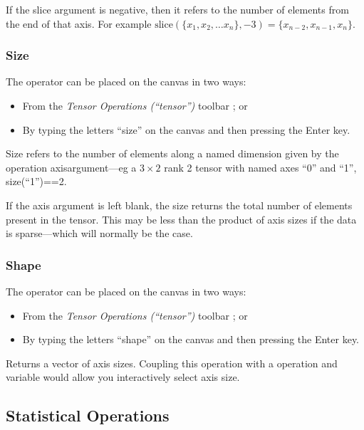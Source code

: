 If the slice argument is negative, then it refers to the number of
elements from the end of that axis. For example $\mathrm{slice}(\{x_{1},x_{2},\ldots x_{n}\},-3)=\{x_{n-2},x_{n-1},x_{n}\}$.

\subsubsection{Size}

\label{Operation:size}


The operator can be placed on the canvas in two ways:
\begin{itemize}
\item From the \emph{Tensor Operations (``tensor'')} toolbar ;
or 
\item By typing the letters ``size'' on the canvas and then pressing the
Enter key.
\end{itemize}
Size refers to the number of elements along a named dimension given
by the operation axisargument---eg a $3\times2$ rank 2 tensor with
named axes ``0'' and ``1'', size(``1'')==2.

If the axis argument is left blank, the size returns the total number
of elements present in the tensor. This may be less than the product
of axis sizes if the data is sparse---which will normally be the
case.

\subsubsection{Shape}

\label{Operation:shape}


The operator can be placed on the canvas in two ways:
\begin{itemize}
\item From the \emph{Tensor Operations (``tensor'')} toolbar ;
or 
\item By typing the letters ``shape'' on the canvas and then pressing the
Enter key.
\end{itemize}
Returns a vector of axis sizes. Coupling this operation with a
 operation and variable would allow
you interactively select axis size.

\subsection{Statistical Operations}
\label{operations-statistics}

